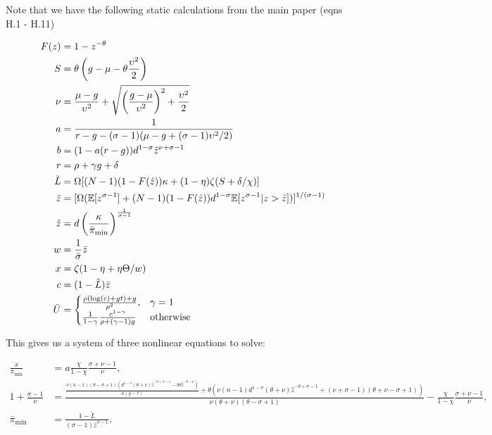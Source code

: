 \documentclass[11pt]{article}
\begin{document}
Note that we have the following static calculations from the main paper (eqns H.1 - H.11)

\begin{align}
	F(z) &= 1 - z^{-\theta} \\
	S &= \theta \left(g - \mu - \theta \frac{\upsilon^2}{2}\right) \\
	\nu &= \frac{\mu - g}{\upsilon^2} + \sqrt{\left(\frac{g - \mu}{\upsilon^2}\right)^2 + \frac{\upsilon^2}{2}} \\
	a &= \frac{1}{r - g - (\sigma - 1)(\mu - g  + (\sigma - 1)\upsilon^2/2)} \\
	b &= (1 - a(r-g))d^{1-\sigma}\hat{z}^{\nu + \sigma -1} \\
	r &= \rho + \gamma g + \delta \\
	\tilde{L} &= \Omega [(N-1)(1 - F(\hat{z}))\kappa + (1-\eta)\zeta(S + \delta/\chi)] \\
	\bar{z} &= [\Omega(\mathbb{E}[z^{\sigma - 1}] + (N-1)(1 - F(\hat{z}))d^{1 - \sigma}\mathbb{E}[z^{\sigma - 1}|z > \hat{z}])]^{1/(\sigma - 1)} \\
	\hat{z} &= d \left(\frac{\kappa}{\bar{\pi}_{\textup{min}}}\right)^{\frac{1}{\sigma - 1}} \\
	w &= \frac{1}{\bar{\sigma}}\bar{z} \\
	x &= \zeta(1 - \eta + \eta \Theta / w) \\
		c &= (1 - \tilde{L})\bar{z} \\
		\bar{U} &=
	\begin{cases}
	\frac{\rho (\log(c) + gt ) + g}{\rho^2}, & \gamma = 1 \\
	\frac{1}{1-\gamma} \frac{c^{1 - \gamma}}{\rho + (\gamma - 1)g} & \text{otherwise}
	\end{cases} 
\end{align}

This gives us a system of three nonlinear equations to solve:

		\begin{align}
		\frac{x}{\bar{\pi}_{\min}} &=  a \frac{\chi}{1-\chi}\frac{\sigma + \nu - 1}{\nu} , \\
		1 + \frac{\sigma - 1}{\nu} &= {\scriptstyle \frac{\frac{\nu  (n-1) (\theta -\sigma +1) \left(d^{1-\sigma } (\theta +\nu ) \hat{z}^{-\theta +\sigma -1}-b \theta  \hat{z}^{-\theta -\nu }\right)}{a (g-r)}+\theta  \left(\nu  (n-1) d^{1-\sigma } (\theta +\nu ) \hat{z}^{-\theta +\sigma -1}+(\nu +\sigma -1) (\theta +\nu -\sigma +1)\right)}{\nu  (\theta +\nu ) (\theta -\sigma +1)} -  \frac{\chi}{1-\chi}\frac{\sigma + \nu - 1}{\nu}} , \\
		\bar{\pi}_{\min} &= \tfrac{1 - \tilde{L}}{(\sigma - 1) \bar{z}^{\sigma - 1}}.
		\end{align}
\end{document}
